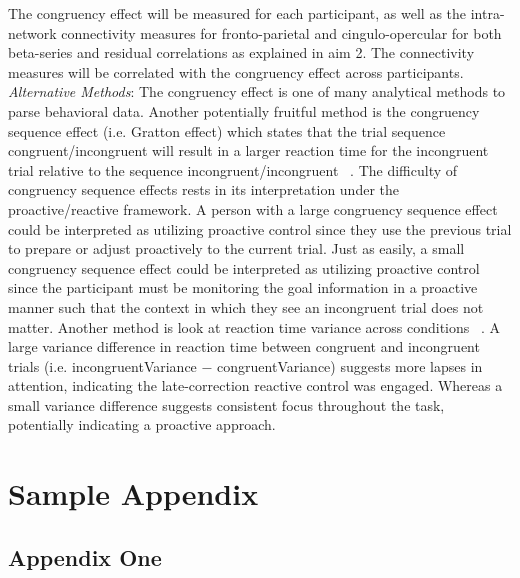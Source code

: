\documentclass[phd,appendix,figures]{uithesis}
\begin{document}
The congruency effect will be measured for each participant, as well as the intra-network connectivity measures for fronto-parietal and cingulo-opercular for both beta-series and residual correlations as explained in aim 2.
The connectivity measures will be correlated with the congruency effect across participants.
\newline
\textit{Alternative Methods}: The congruency effect is one of many analytical methods to parse behavioral data.
Another potentially fruitful method is the congruency sequence effect (i.e. Gratton effect) which states that the trial sequence congruent/incongruent will result in a larger reaction time for the incongruent trial relative to the sequence incongruent/incongruent ~\citep{Gehring1992,Egner2007}.
The difficulty of congruency sequence effects rests in its interpretation under the proactive/reactive framework.
A person with a large congruency sequence effect could be interpreted as utilizing proactive control since they use the previous trial to prepare or adjust proactively to the current trial.
Just as easily, a small congruency sequence effect could be interpreted as utilizing proactive control since the participant must be monitoring the goal information in a proactive manner such that the context in which they see an incongruent trial does not matter.
Another method is look at reaction time variance across conditions ~\citep{Fassbender2014}. 
A large variance difference in reaction time between congruent and incongruent trials (i.e. incongruentVariance $-$ congruentVariance) suggests more lapses in attention, indicating the late-correction reactive control was engaged.
Whereas a small variance difference suggests consistent focus throughout the task, potentially indicating a proactive approach.



\appendix

\chapter{Sample Appendix}

\section{Appendix One}
\blindtext
\end{document}
